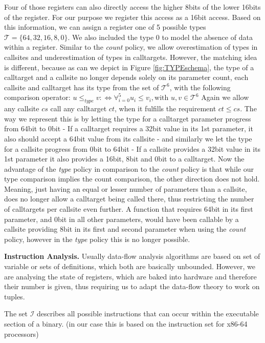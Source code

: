 Four of those registers can also directly access the higher 8bits of the lower 16bits of the register. For our purpose we register this access as a 16bit access. Based on this information, we can assign a register one of 5 possible types $\mathcal{T} = \{64, 32, 16, 8, 0\}$. We also included the type 0 to model the absence of data within a register. Similar to the \emph{count} policy, we allow overestimation of types in callsites and underestimation of types in calltargets. However, the matching idea is different, 
because as can we depict in Figure \ref{fig:TYPEschema}, the type of a calltarget and a callsite no longer depends solely on its parameter count, each callsite and calltarget has its type from the set of $\mathcal{T}^6$, with the following comparison operator:
$
	u \leq_{type} v :\Longleftrightarrow  
	\forall_{i = 0}^{5} {u_i \leq v_i} , \text {with } u, v \in \mathcal{T}^6
$
Again we allow any callsite $cs$ call any calltarget $ct$, when it fulfills the requirement $ct \leq cs$. The way we represent this is by letting the type for a calltarget parameter progress from 64bit to 0bit - If a calltarget requires a 32bit value in its 1st parameter, it also should accept a 64bit value from its callsite - and similarly we let the type for a callsite progress from 0bit to 64bit - If a callsite provides a 32bit value in its 1st parameter it also provides a 16bit, 8bit and 0bit to a calltarget. Now the advantage of the \emph{type} policy in comparison to the \emph{count} policy is that while our type comparison implies the count comparison, the other direction does not hold. Meaning, just having an equal or lesser number of parameters than a callsite, does no longer allow a calltarget being called there, thus restricting the number of calltargets per callsite even further. A function that requires 64bit in its first parameter, and 0bit in all other parameters, would have been callable by a callsite providing 8bit in its first and second parameter when using the \emph{count} policy, however in the \emph{type} policy this is no longer possible.


\textbf{Instruction Analysis.}
\label{section:instructionanalysis}
Usually data-flow analysis algorithms are based on set of variable or sets of definitions, which both are basically unbounded. However, we are analysing the state of registers, which are baked into hardware and therefore their number is given, thus requiring us to adapt the data-flow theory to work on tuples.

The set $\mathcal{I}$ describes all possible instructions that can occur within the executable section of a binary. (in our case this is based on the instruction set for x86-64 processors)

